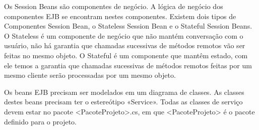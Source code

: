 Os Session Beans são componentes de negócio. A lógica de negócio dos componentes
EJB se encontram nestes componentes. Existem dois tipos de Componentes Session
Bean, o Stateless Session Bean e o Stateful Session Beans. O Stateless é um
componente de negócio que não mantém conversação com o usuário, não há garantia
que chamadas sucessivas de métodos remotos vão ser feitas no mesmo objeto. O
Stateful é um componente que mantêm estado, com ele temos a garantia que
chamadas sucessivas de métodos remotos feitas por um mesmo cliente serão
processadas por um mesmo objeto.

Os beans EJB precisam ser modelados em um diagrama de classes. As classes destes beans precisam ter o estereótipo «Service». Todas as classes de serviço devem estar no pacote <PacoteProjeto>.cs, em que <PacoteProjeto> é o pacote definido para o projeto.

